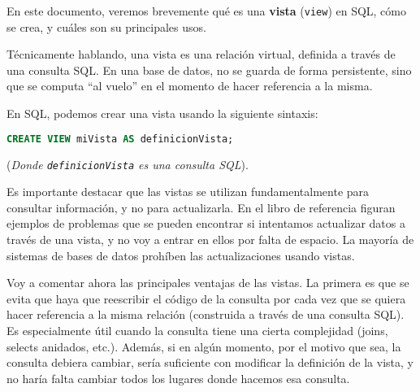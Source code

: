 \documentclass[12pt, a4paper]{article}
\title{\size{15pt}{Vistas, vistas desde un punto de vista práctico} \vspace{-2ex}}
\date{\vspace{-5ex}}
\begin{document}
\maketitle
\thispagestyle{empty}

\vspace{-10ex}

En este documento, veremos brevemente qué es una \textbf{vista} (\texttt{view}) en SQL, cómo se crea, y cuáles son su principales usos.

Técnicamente hablando, una vista es una relación virtual, definida a través de una consulta SQL. En una base de datos, no se guarda de forma persistente, sino que se computa ``al vuelo'' en el momento de hacer referencia a la misma.

En SQL, podemos crear una vista usando la siguiente sintaxis:

\begin{center}
\begin{minipage}[c]{0,7\textwidth}
\begin{lstlisting}[language=SQL]
CREATE VIEW miVista AS definicionVista;
\end{lstlisting}
(\textit{Donde \texttt{definicionVista} es una consulta SQL}).
\end{minipage}
\end{center}



Es importante destacar que las vistas se utilizan fundamentalmente para consultar información, y no para actualizarla. En el libro de referencia figuran ejemplos de problemas que se pueden encontrar si intentamos actualizar datos a través de una vista, y no voy a entrar en ellos por falta de espacio. La mayoría de sistemas de bases de datos prohíben las actualizaciones usando vistas.

Voy a comentar ahora las principales ventajas de las vistas. La primera es que se evita que haya que reescribir el código de la consulta por cada vez que se quiera hacer referencia a la misma relación (construida a través de una consulta SQL). Es especialmente útil cuando la consulta tiene una cierta complejidad (joins, selects anidados, etc.). Además, si en algún momento, por el motivo que sea, la consulta debiera cambiar, sería suficiente con modificar la definición de la vista, y no haría falta cambiar todos los lugares donde hacemos esa consulta.
\end{document}
